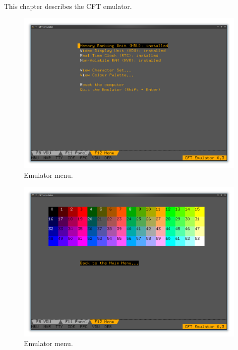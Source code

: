 This chapter describes the CFT emulator.












\begin{figure}
  \centering
  \includegraphics[width=0.9\columnwidth]{../figs/emulator-tab-menu-1.png}
  \caption{\label{fig:vdu:impractical-modes}Emulator menu.}
\end{figure}

\begin{figure}
  \centering
  \includegraphics[width=0.9\columnwidth]{../figs/emulator-tab-menu-2.png}
  \caption{\label{fig:vdu:impractical-modes}Emulator menu.}
\end{figure}

